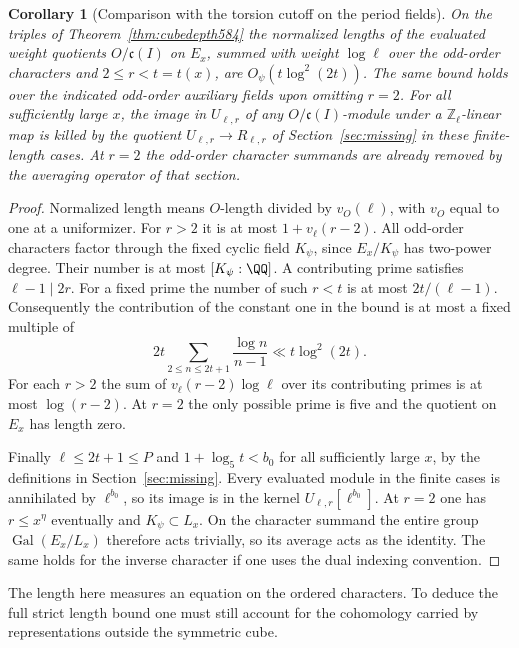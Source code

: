 \documentclass[a4paper,11pt]{article}
\newtheorem{corollary}[proposition]{Corollary}
\theoremstyle{definition}
\theoremstyle{remark}
\newcommand{\ZZ}{\mathbb Z}\newcommand{\ord}{\operatorname{ord}}
\numberwithin{equation}{section}
\begin{document}
\begin{corollary}[Comparison with the torsion cutoff on the period fields]
\leavevmode\label{cor:cubecutoff584}
On the triples of Theorem~\ref{thm:cubedepth584} the normalized
lengths of the evaluated weight quotients \(O/\mathfrak c(I)\)
on \(E_x\), summed with weight \(\log\ell\) over the odd-order
characters and \(2\le r<t=t(x)\), are
\(O_\psi(t\log^2(2t))\). The same bound holds over the indicated
odd-order auxiliary fields upon omitting \(r=2\).
For all sufficiently large \(x\), the image in \(U_{\ell,r}\)
of any \(O/\mathfrak c(I)\)-module under a \(\ZZ_\ell\)-linear
map is killed by the quotient
\(U_{\ell,r}\to R_{\ell,r}\) of Section~\ref{sec:missing}
in these finite-length cases. At \(r=2\) the odd-order
character summands are already removed by the averaging
operator of that section.
\end{corollary}
\begin{proof}
Normalized length means \(O\)-length divided by
\(v_O(\ell)\), with \(v_O\) equal to one at a uniformizer.
For \(r>2\) it is at most \(1+v_\ell(r-2)\). All odd-order
characters factor through the fixed cyclic field \(K_\psi\),
since \(E_x/K_\psi\) has two-power degree. Their number is
at most \([K_\psi:\QQ]\). A contributing prime satisfies
\(\ell-1\mid2r\). For a fixed prime the number of such \(r<t\)
is at most \(2t/(\ell-1)\). Consequently the contribution
of the constant one in the bound is at most a fixed multiple of
\[
        2t\sum_{2\le n\le2t+1}\frac{\log n}{n-1}
                         \ll t\log^2(2t).
\]
For each \(r>2\) the sum of \(v_\ell(r-2)\log\ell\)
over its contributing primes is at most \(\log(r-2)\).
At \(r=2\) the only possible prime is five and the
quotient on \(E_x\) has length zero.

Finally \(\ell\le2t+1\le P\) and \(1+\log_5 t<b_0\)
for all sufficiently large \(x\), by the definitions in
Section~\ref{sec:missing}. Every evaluated module in the
finite cases is annihilated by \(\ell^{b_0}\), so its image
is in the kernel \(U_{\ell,r}[\ell^{b_0}]\). At \(r=2\)
one has \(r\le x^\eta\) eventually and \(K_\psi\subset L_x\).
On the character summand the entire group
\(\operatorname{Gal}(E_x/L_x)\) therefore acts trivially,
so its average acts as the identity. The same holds for the
inverse character if one uses the dual indexing convention.
\end{proof}

The length here measures an equation on the ordered characters.
To deduce the full strict length bound one must still account
for the cohomology carried by representations outside the
symmetric cube.
\end{document}
